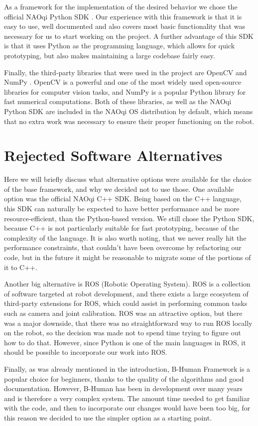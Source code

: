 As a framework for the implementation of the desired behavior we chose the
official NAOqi Python SDK \cite{naoqi-sdk}. Our experience with this framework
is that it is easy to use, well documented and also covers most basic
functionality that was necessary for us to start working on the project. A
further advantage of this SDK is that it uses Python as the programming
language, which allows for quick prototyping, but also makes maintaining a
large codebase fairly easy.

Finally, the third-party libraries that were used in the project are OpenCV and
NumPy \cite{opencv, numpy}. OpenCV is a powerful and one of the most widely
used open-source libraries for computer vision tasks, and NumPy is a popular
Python library for fast numerical computations. Both of these libraries, as
well as the NAOqi Python SDK are included in the NAOqi OS distribution by
default, which means that no extra work was necessary to ensure their proper
functioning on the robot.

\section{Rejected Software Alternatives}

Here we will briefly discuss what alternative options were available for the
choice of the base framework, and why we decided not to use those. One
available option was the official NAOqi C++ SDK. Being based on the C++
language, this SDK can naturally be expected to have better performance and be
more resource-efficient, than the Python-based version. We still chose the
Python SDK, because C++ is not particularly suitable for fast prototyping,
because of the complexity of the language. It is also worth noting, that we
never really hit the performance constraints, that couldn't have been overcome
by refactoring our code, but in the future it might be reasonable to migrate
some of the portions of it to C++.

Another big alternative is ROS \cite{ros} (Robotic Operating System). ROS is a
collection of software targeted at robot development, and there exists a large
ecosystem of third-party extensions for ROS, which could assist in performing
common tasks such as camera and joint calibration. ROS was an attractive
option, but there was a major downside, that there was no straightforward way
to run ROS locally on the robot, so the decision was made not to spend time
trying to figure out how to do that. However, since Python is one of the main
languages in ROS, it should be possible to incorporate our work into ROS.

Finally, as was already mentioned in the introduction, B-Human Framework is a
popular choice for beginners, thanks to the quality of the algorithms and good
documentation. However, B-Human has been in development over many years and is
therefore a very complex system. The amount time needed to get familiar with
the code, and then to incorporate our changes would have been too big, for this
reason we decided to use the simpler option as a starting point.
